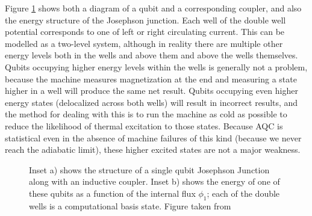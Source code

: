 Figure \ref{fig:josephson} shows both a diagram of a qubit and a corresponding coupler, and also the energy structure of the Josephson junction.  Each well of the double well potential corresponds to one of left or right circulating current.  This can be modelled as a two-level system, although in reality there are multiple other energy levels both in the wells and above them and above the wells themselves.  Qubits occupying higher energy levels within the wells is generally not a problem, because the machine measures magnetization at the end and measuring a state higher in a well will produce the same net result.\cite{qubit}
Qubits occupying even higher energy states (delocalized across both wells) will result in incorrect results, and the method for dealing with this is to run the machine as cold as possible to reduce the likelihood of thermal excitation to those states. Because AQC is statistical even in the absence of machine failures of this kind (because we never reach the adiabatic limit), these higher excited states are not a major weakness.
\begin{figure}
	\caption[Josephson Junction and Energy Diagram]{Inset a) shows the structure of a single qubit Josephson Junction along with an inductive coupler.  Inset b) shows the energy of one of these qubits as a function of the internal flux $\phi_1$; each of the double wells is a computational basis state.  Figure taken from \cite{qubit}}
	\label{fig:josephson}
\end{figure}

